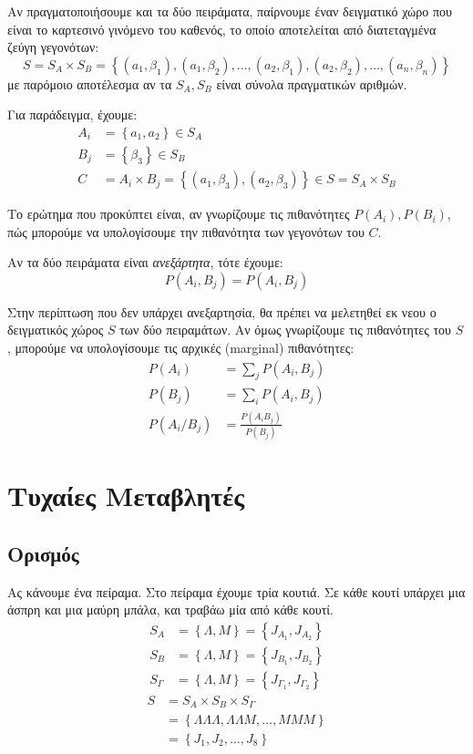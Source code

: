 \documentclass[11pt,a4paper,notitlepage,fleqn,final]{article}
\begin{document}
	Αν πραγματοποιήσουμε και τα δύο πειράματα, παίρνουμε έναν δειγματικό
	χώρο που είναι το καρτεσινό γινόμενο του καθενός, το οποίο
	αποτελείται από διατεταγμένα ζεύγη γεγονότων:
	\[
	S = S_A \times S_B = \left\lbrace 
	(a_1,\beta_1),(a_1,\beta_2),\dots,(a_2,\beta_1),(a_2,\beta_2),\dots,
	(a_n,\beta_n)
	 \right\rbrace
	\]
	με παρόμοιο αποτέλεσμα αν τα \( S_A,S_B \) είναι σύνολα πραγματικών
	αριθμών.
	
	Για παράδειγμα, έχουμε:
	\begin{align*}
		A_i &= \left\lbrace a_1,a_2 \right\rbrace \in S_A \\
		B_j &= \left\lbrace \beta_3 \right\rbrace \in S_B \\
		C &= A_i \times B_j = \left\lbrace
		(a_1,\beta_3),(a_2,\beta_3) \right\rbrace \in S = S_A \times S_B
	\end{align*}
	
	Το ερώτημα που προκύπτει είναι, αν γνωρίζουμε τις πιθανότητες
	\( P(A_i), P(B_i) \), πώς μπορούμε να υπολογίσουμε την πιθανότητα
	των γεγονότων του \( C \).
	
	Αν τα δύο πειράματα είναι \textit{ανεξάρτητα}, τότε έχουμε:
	\[
	P(A_i,B_j) = P(A_i, B_j)
	\]
	
	Στην περίπτωση που δεν υπάρχει ανεξαρτησία, θα πρέπει να μελετηθεί
	εκ νεου ο δειγματικός χώρος \( S \) των δύο πειραμάτων. Αν όμως
	γνωρίζουμε τις πιθανότητες του \( S \), μπορούμε να υπολογίσουμε
	τις αρχικές (marginal) πιθανότητες:
	\begin{align*}
		P(A_i) &= \sum_j P(A_i, B_j) \\
		P(B_j) &= \sum_i P(A_i, B_j) \\
		P(A_i/B_j) &= \frac{P(A_iB_j)}{P(B_j)}
	\end{align*}
	
	\section{Τυχαίες Μεταβλητές}
	\subsection{Ορισμός}
	Ας κάνουμε ένα πείραμα. Στο πείραμα έχουμε τρία κουτιά. Σε κάθε
	κουτί υπάρχει μια άσπρη και μια μαύρη μπάλα, και τραβάω μία από
	κάθε κουτί.
	\begin{align*}
		S_A &= \left\lbrace \varLambda, M \right\rbrace
		= \left\lbrace J_{A_1},J_{A_2} \right\rbrace \\
		S_B &= \left\lbrace \varLambda, M \right\rbrace
		= \left\lbrace J_{B_1},J_{B_2} \right\rbrace \\
		S_\varGamma &= \left\lbrace \varLambda, M \right\rbrace
		= \left\lbrace J_{\varGamma_1},J_{\varGamma_2} \right\rbrace
	\end{align*}
	\begin{align*}
		S &= S_A \times S_B \times S_\varGamma \\
		&= \left\lbrace \varLambda\varLambda\varLambda,
		\varLambda\varLambda M,\dots,MMM \right\rbrace
		\\ &= \left\lbrace J_1,J_2,\dots,J_8 \right\rbrace
	\end{align*}
	
\end{document}
